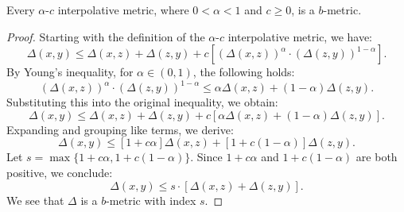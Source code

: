 \documentclass[10pt,a4paper]{amsart}
\begin{document}
\begin{lemma} \label{not_new}
Every \(\alpha\)-\(c\) interpolative metric, where \(0<\alpha<1\) and \(c\ge 0\),  is a \(b\)-metric.
\end{lemma}

\begin{proof}
Starting with the definition of the \(\alpha\)-\(c\) interpolative metric, we have:
\[
\Delta(x, y) \leq \Delta(x, z) + \Delta(z, y) + c \left[ (\Delta(x, z))^\alpha \cdot (\Delta(z, y))^{1-\alpha} \right].
\]
By Young's inequality, for \( \alpha \in (0, 1) \), the following holds:
\[
(\Delta(x, z))^\alpha \cdot (\Delta(z, y))^{1-\alpha} \leq \alpha \Delta(x, z) + (1-\alpha) \Delta(z, y).
\]
Substituting this into the original inequality, we obtain:
\[
\Delta(x, y) \leq \Delta(x, z) + \Delta(z, y) + c \left[ \alpha \Delta(x, z) + (1-\alpha) \Delta(z, y) \right].
\]
Expanding and grouping like terms, we derive:
\[
\Delta(x, y) \leq \left[1 + c \alpha \right] \Delta(x, z) + \left[1 + c (1-\alpha) \right] \Delta(z, y).
\]
Let \( s = \max\{1 + c \alpha, 1 + c (1-\alpha)\} \). Since \( 1 + c \alpha \) and \( 1 + c (1-\alpha) \) are both positive, we conclude:
\[
\Delta(x, y) \leq s \cdot \left[ \Delta(x, z) + \Delta(z, y) \right].
\]
 We see that $\Delta$ is a \(b\)-metric with index \(s\).
\end{proof}
\end{document}
